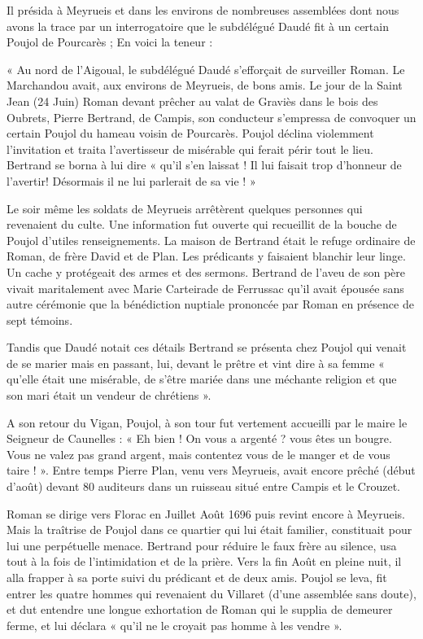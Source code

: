 Il présida à Meyrueis et dans les environs de nombreuses assemblées dont nous avons la trace par un interrogatoire que le subdélégué Daudé fit à un certain Poujol de Pourcarès ; En voici la teneur :

\vspace{15mm}

\begin{tcolorbox}[
  colback=white,
  colframe=black,
  boxrule=0.7pt,
  arc=0pt,
  left=0.20cm,
  right=0.20cm,
  top=0.10cm,
  bottom=0.10cm,
  boxsep=0pt
]
\small

« Au nord de l’Aigoual, le subdélégué Daudé s’efforçait de surveiller Roman. Le Marchandou avait, aux environs de Meyrueis, de bons amis. Le jour de la Saint Jean (24 Juin) Roman devant prêcher au valat de Graviès dans le bois des Oubrets, Pierre Bertrand, de Campis, son conducteur s’empressa de convoquer un certain Poujol du hameau voisin de Pourcarès. Poujol déclina violemment l’invitation et traita l’avertisseur de misérable qui ferait périr tout le lieu. Bertrand se borna à lui dire « qu’il s’en laissat ! Il lui faisait trop d’honneur de l’avertir! Désormais il ne lui parlerait de sa vie ! »

Le soir même les soldats de Meyrueis arrêtèrent quelques personnes qui revenaient du culte. Une information fut ouverte qui recueillit de la bouche de Poujol d’utiles renseignements. La maison de Bertrand était le refuge ordinaire de Roman, de frère David et de Plan. Les prédicants y faisaient blanchir leur linge. Un cache y protégeait des armes et des sermons. Bertrand de l’aveu de son père vivait maritalement avec Marie Carteirade de Ferrussac qu’il avait épousée sans autre cérémonie que la bénédiction nuptiale prononcée par Roman en présence de sept témoins.

Tandis que Daudé notait ces détails Bertrand se présenta chez Poujol qui venait de se marier mais en passant, lui, devant le prêtre et vint dire à sa femme « qu’elle était une misérable, de s’être mariée dans une méchante religion et que son mari était un vendeur de chrétiens ».

A son retour du Vigan, Poujol, à son tour fut vertement accueilli par le maire le Seigneur de Caunelles : « Eh bien ! On vous a argenté ? vous êtes un bougre. Vous ne valez pas grand argent, mais contentez vous de le manger et de vous taire ! ». Entre temps Pierre Plan, venu vers Meyrueis, avait encore prêché (début d’août) devant 80 auditeurs dans un ruisseau situé entre Campis et le Crouzet.

Roman se dirige vers Florac en Juillet Août 1696 puis revint encore à Meyrueis. Mais la traîtrise de Poujol dans ce quartier qui lui était familier, constituait pour lui une perpétuelle menace. Bertrand pour réduire le faux frère au silence, usa tout à la fois de l’intimidation et de la prière. Vers la fin Août en pleine nuit, il alla frapper à sa porte suivi du prédicant et de deux amis. Poujol se leva, fit entrer les quatre hommes qui revenaient du Villaret (d’une assemblée sans doute), et dut entendre une longue exhortation de Roman qui le supplia de demeurer ferme, et lui déclara « qu’il ne le croyait pas homme à les vendre ».


\end{tcolorbox}
